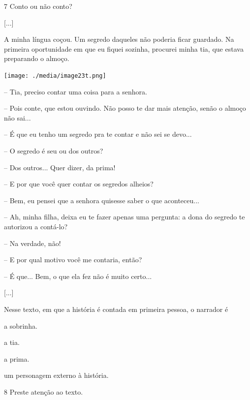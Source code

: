 \pagebreak
\num{7} Conto ou não conto?

\begin{myquote}
{[}...{]}

A minha língua coçou. Um segredo daqueles não poderia ficar guardado. Na
primeira oportunidade em que eu fiquei sozinha, procurei minha tia, que
estava preparando o almoço.

\begin{center}
\texttt{[image: ./media/image23t.png]}
\end{center}

-- Tia, preciso contar uma coisa para a senhora.

-- Pois conte, que estou ouvindo. Não posso te dar mais atenção, senão o
almoço não sai...

-- É que eu tenho um segredo pra te contar e não sei se devo...

-- O segredo é seu ou dos outros?

-- Dos outros... Quer dizer, da prima!

-- E por que você quer contar os segredos alheios?

-- Bem, eu pensei que a senhora quisesse saber o que aconteceu...

-- Ah, minha filha, deixa eu te fazer apenas uma pergunta: a dona do
segredo te autorizou a contá-lo?

-- Na verdade, não!

-- E por qual motivo você me contaria, então?

-- É que... Bem, o que ela fez não é muito certo...

{[}...{]}

\end{myquote}

Nesse texto, em que a história é contada em primeira pessoa, o narrador
é

\begin{escolha}
\item a sobrinha.

\item a tia.

\item a prima.

\item um personagem externo à história.
\end{escolha}


\num{8} Preste atenção ao texto.

